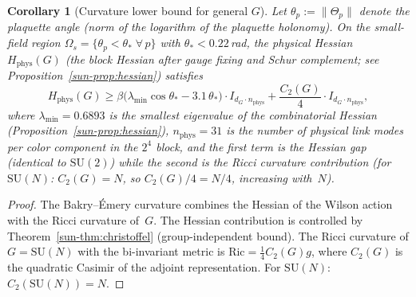 \documentclass[11pt]{article}
\newtheorem{corollary}[theorem]{Corollary}
\theoremstyle{definition}
\newcommand{\SU}{\mathrm{SU}}
\begin{document}
\begin{corollary}[Curvature lower bound for general $G$]
\label{sun-cor:curvature}
Let $\theta_p:=\|\Theta_p\|$ denote the plaquette angle
(norm of the logarithm of the plaquette holonomy).
On the small-field region
$\Omega_s=\{\theta_p<\theta_*\;\forall\,p\}$
with $\theta_*<0.22$\,rad, the physical Hessian
$H_{\mathrm{phys}}(G)$ (the block Hessian after gauge
fixing and Schur complement; see
Proposition~\textup{\ref{sun-prop:hessian}}) satisfies
\begin{equation}\label{sun-eq:hessian-bound}
H_{\mathrm{phys}}(G)
\ge\beta\bigl(\lambda_{\min}\cos\theta_*
-3.1\,\theta_*\bigr)\cdot I_{d_G\cdot n_{\mathrm{phys}}}
+\frac{C_2(G)}{4}\cdot I_{d_G\cdot n_{\mathrm{phys}}},
\end{equation}
where $\lambda_{\min}=0.6893$ is the smallest eigenvalue
of the combinatorial Hessian
(Proposition~\textup{\ref{sun-prop:hessian}}),
$n_{\mathrm{phys}}=31$ is the number of physical link
modes per color component in the $2^4$ block, and
the first term is the Hessian gap (identical to
$\SU(2)$) while the second is the Ricci curvature
contribution (for $\SU(N)$: $C_2(G)=N$,
so $C_2(G)/4=N/4$, increasing with~$N$).
\end{corollary}

\begin{proof}
The Bakry--\'Emery curvature combines the Hessian of
the Wilson action with the Ricci curvature of~$G$.
The Hessian contribution is controlled by
Theorem~\ref{sun-thm:christoffel} (group-independent bound).
The Ricci curvature of $G=\SU(N)$ with the
bi-invariant metric is $\mathrm{Ric}=\frac{1}{4}C_2(G)g$,
where $C_2(G)$ is the quadratic Casimir of the adjoint
representation.  For $\SU(N)$: $C_2(\SU(N))=N$.
\end{proof}


\label{sun-sec:hessian}
\end{document}
